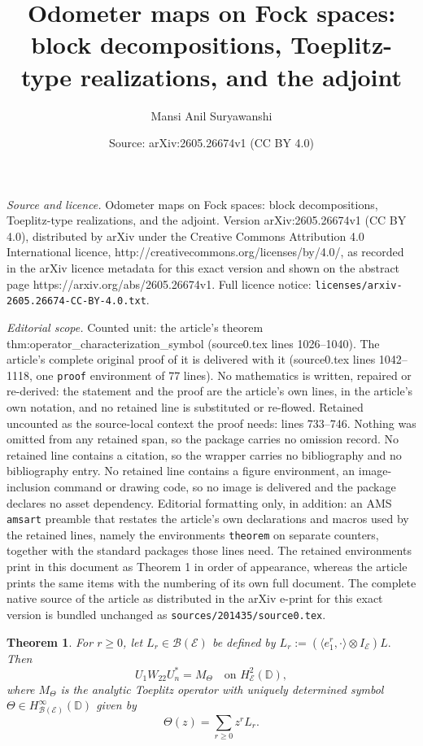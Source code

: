 \documentclass[10pt,a4paper]{amsart}
\title{Odometer maps on Fock spaces: block decompositions, Toeplitz-type realizations, and the adjoint}
\author{Mansi Anil Suryawanshi}
\date{Source: arXiv:2605.26674v1 (CC BY 4.0)}
\newtheorem{theorem}{Theorem}
\def \D{\mathbb{D}}
\newcommand{\clb}{\mathcal{B}}
\newcommand{\cle}{\mathcal{E}}
\begin{document}
\maketitle

\noindent\emph{Source and licence.} Odometer maps on Fock spaces: block decompositions, Toeplitz-type realizations, and the adjoint. Version arXiv:2605.26674v1 (CC BY 4.0), distributed by arXiv under the Creative Commons Attribution 4.0 International licence, http://creativecommons.org/licenses/by/4.0/, as recorded in the arXiv licence metadata for this exact version and shown on the abstract page https://arxiv.org/abs/2605.26674v1. Full licence notice: \texttt{licenses/arxiv-2605.26674-CC-BY-4.0.txt}.\par\smallskip

\noindent\textit{Editorial scope.} Counted unit: the article's theorem thm:operator\_characterization\_symbol (source0.tex lines 1026--1040). The article's complete original proof of it is delivered with it (source0.tex lines 1042--1118, one \texttt{proof} environment of 77 lines). No mathematics is written, repaired or re-derived: the statement and the proof are the article's own lines, in the article's own notation, and no retained line is substituted or re-flowed.  Retained uncounted as the source-local context the proof needs: lines 733--746.  Nothing was omitted from any retained span, so the package carries no omission record.  No retained line contains a citation, so the wrapper carries no bibliography and no bibliography entry.  No retained line contains a figure environment, an image-inclusion command or drawing code, so no image is delivered and the package declares no asset dependency.  Editorial formatting only, in addition: an AMS \texttt{amsart} preamble that restates the article's own declarations and macros used by the retained lines, namely the environments \texttt{theorem} on separate counters, together with the standard packages those lines need.  The retained environments print in this document as Theorem 1 in order of appearance, whereas the article prints the same items with the numbering of its own full document.  The complete native source of the article as distributed in the arXiv e-print for this exact version is bundled unchanged as \texttt{sources/201435/source0.tex}.
\begin{theorem}\label{prop:hardy_space_multiplier}
For \(r\geq 0\), let
\(L_r\in\clb(\cle)\) be defined by $L_r:=(\langle e_1^r,\cdot\rangle\otimes I_\cle)L.$
Then
\[
U_1W_{22}U_n^*=M_\Theta
\quad \text{on } H^2_{\cle}(\D),
\]
where \(M_\Theta\) is the analytic Toeplitz operator with uniquely determined
symbol \(\Theta\in H^\infty_{\clb(\cle)}(\D)\) given by
\[
\Theta(z)=\sum_{r\geq 0}z^rL_r.
\]
\end{theorem}
\end{document}

